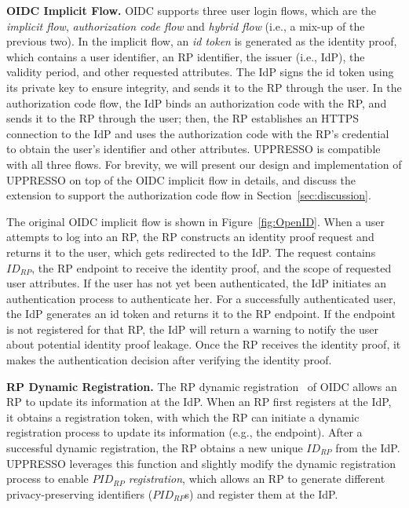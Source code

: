 \vspace{1mm}\noindent\textbf{OIDC Implicit Flow.}
 OIDC supports three user login flows, which are the {\em implicit flow}, {\em authorization code flow} and {\em hybrid flow} (i.e., a mix-up of the previous two).
 In the implicit flow, an {\em id token} is generated as the identity proof, which contains a user identifier, an RP identifier,
    the issuer (i.e., IdP), the validity period, and other requested attributes.
The IdP signs the id token using its private key to ensure integrity, and sends it to the RP through the user.
In the authorization code flow, the IdP binds an authorization code with the RP, and sends it to the RP through the user;
then, the RP establishes an HTTPS connection to the IdP %
    and uses the authorization code with the RP's credential to obtain the user's identifier and other attributes.
UPPRESSO is compatible with all three flows. For brevity, we will present our design and implementation of UPPRESSO on top of the OIDC implicit flow in details, and discuss the extension to support the authorization code flow in Section~\ref{sec:discussion}.

The original OIDC implicit flow is shown in Figure~\ref{fig:OpenID}. When a user attempts to log into an RP,
    the RP constructs an identity proof request and returns it to the user, which gets redirected to the IdP.
The request contains $ID_{RP}$, the RP endpoint to receive the identity proof, and the scope of requested user attributes.
If the user has not yet been authenticated, the IdP initiates an authentication process to authenticate her.
For a successfully authenticated user, the IdP generates an id token  and returns it to the RP endpoint.
If the endpoint is not registered for that RP,
    the IdP will return a warning to notify the user about potential identity proof leakage.
Once the RP receives the identity proof, it makes the authentication decision after verifying the identity proof.

\vspace{1mm}\noindent\textbf{RP Dynamic Registration.} The RP dynamic registration~\cite{DynamicRegistration} of OIDC allows an RP to update its information at the IdP. When an RP first registers at the IdP, it obtains a registration token, with which the RP can initiate a dynamic registration process to update its information (e.g., the endpoint).
After a successful dynamic registration, the RP obtains a new unique $ID_{RP}$ from the IdP.
UPPRESSO leverages this function and slightly modify the dynamic registration process to enable {\em $PID_{RP}$ registration},
 which allows an RP to generate different privacy-preserving identifiers ($PID_{RP}$s) and register them at the IdP.

